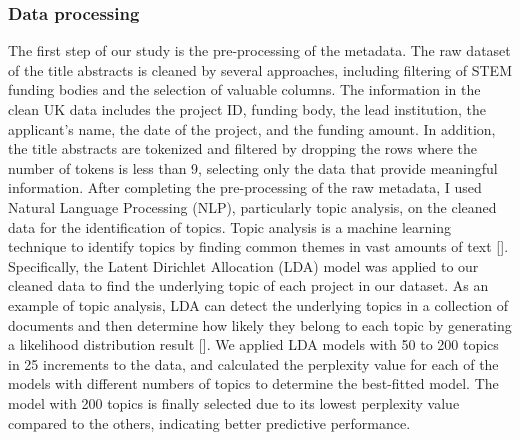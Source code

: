 \subsubsection{Data processing}

The first step of our study is the pre-processing of the metadata. The raw dataset of the title abstracts is cleaned by several approaches, including filtering of STEM funding bodies and the selection of valuable columns. The information in the clean UK data includes the project ID, funding body, the lead institution, the applicant's name, the date of the project, and the funding amount. In addition, the title abstracts are tokenized and filtered by dropping the rows where the number of tokens is less than 9, selecting only the data that provide meaningful information.
\bigbreak
\noindent After completing the pre-processing of the raw metadata, I used Natural Language Processing (NLP), particularly topic analysis, on the cleaned data for the identification of topics.  Topic analysis is a machine learning technique to identify topics by finding common themes in vast amounts of text [\cite{Flavia}]. Specifically, the Latent Dirichlet Allocation (LDA) model was applied to our cleaned data to find the underlying topic of each project in our dataset. As an example of topic analysis, LDA can detect the underlying topics in a collection of documents and then determine how likely they belong to each topic by generating a likelihood distribution result [\cite{wikipedia2023latent}]. We applied LDA models with 50 to 200 topics in 25 increments to the data, and calculated the perplexity value for each of the models with different numbers of topics to determine the best-fitted model. The model with 200 topics is finally selected due to its lowest perplexity value compared to the others, indicating better predictive performance. 

